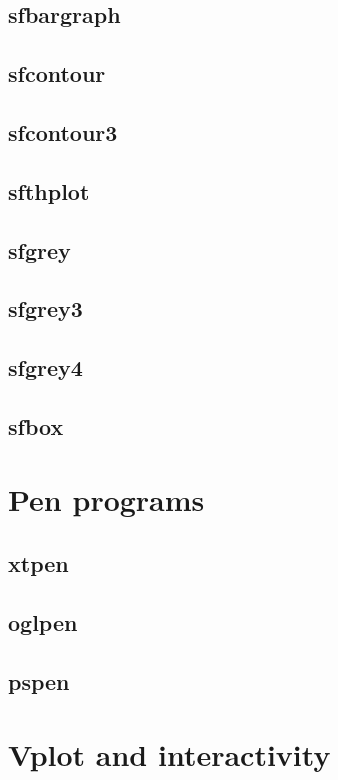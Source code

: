 \subsection{sfbargraph}

\subsection{sfcontour}

\subsection{sfcontour3}

\subsection{sfthplot}

\subsection{sfgrey}

\subsection{sfgrey3}

\subsection{sfgrey4}

\subsection{sfbox}

\section{Pen programs}

\subsection{xtpen}

\subsection{oglpen}

\subsection{pspen}

\section{Vplot and interactivity}





